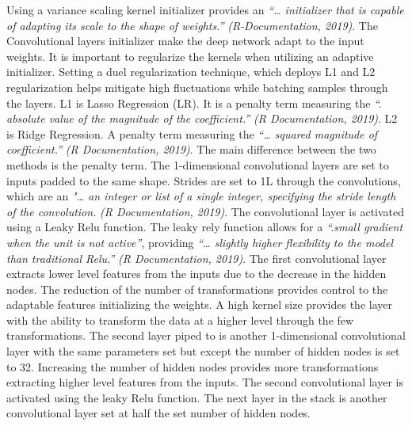 \documentclass[conference,final,]{IEEEtran}
\begin{document}
Using a variance scaling kernel initializer provides an \emph{``\ldots{} initializer that is capable of adapting its scale to the shape of weights.''} \emph{(R-Documentation, 2019)}.
The Convolutional layers initializer make the deep network adapt to the input weights.
It is important to regularize the kernels when utilizing an adaptive initializer.
Setting a duel regularization technique, which deploys L1 and L2 regularization helps mitigate high fluctuations while batching samples through the layers. L1 is Lasso Regression (LR).
It is a penalty term measuring the \emph{``. absolute value of the magnitude of the coefficient.''} \emph{(R Documentation, 2019)}.
L2 is Ridge Regression.
A penalty term measuring the \emph{``\ldots{} squared magnitude of coefficient.''} \emph{(R Documentation, 2019)}.
The main difference between the two methods is the penalty term. The 1-dimensional convolutional layers are set to inputs padded to the same shape.
Strides are set to 1L through the convolutions, which are an \emph{"\ldots{} an integer or list of a single integer, specifying the stride length of the convolution.} \emph{(R Documentation, 2019)}.
The convolutional layer is activated using a Leaky Relu function.
The leaky rely function allows for a \emph{``.small gradient when the unit is not active''}, providing \emph{``\ldots{} slightly higher flexibility to the model than traditional Relu.''} \emph{(R Documentation, 2019)}.
The first convolutional layer extracts lower level features from the inputs due to the decrease in the hidden nodes.
The reduction of the number of transformations provides control to the adaptable features initializing the weights.
A high kernel size provides the layer with the ability to transform the data at a higher level through the few transformations.
The second layer piped to is another 1-dimensional convolutional layer with the same parameters set but except the number of hidden nodes is set to 32.
Increasing the number of hidden nodes provides more transformations extracting higher level features from the inputs.
The second convolutional layer is activated using the leaky Relu function.
The next layer in the stack is another convolutional layer set at half the set number of hidden nodes.
\end{document}
